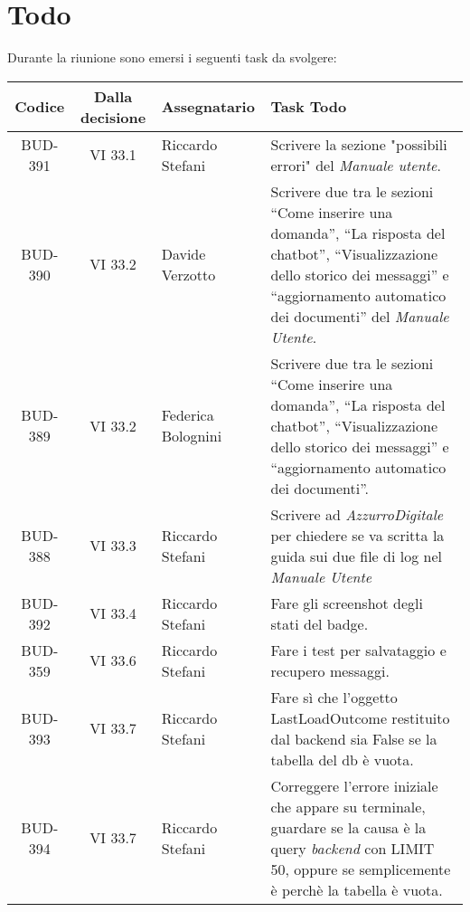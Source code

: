 
\section{Todo}

Durante la riunione sono emersi i seguenti task da svolgere:

\vspace{0.5cm}

\begin{table}[htbp]
\centering
{}
\begin{tabular}{|c|c|p{}|p{}|}
    \hline
    \rowcolor[gray]{0.75}
    \textbf{Codice} & \textbf{Dalla decisione} & \textbf{Assegnatario} & \textbf{Task Todo} \\
    \hline
    BUD-391 & VI 33.1 & Riccardo Stefani & Scrivere la sezione "possibili errori" del \emph{Manuale utente}.\\
    \hline
    BUD-390 & VI 33.2 & Davide Verzotto & Scrivere due tra le sezioni “Come inserire una domanda”, “La risposta del chatbot”, “Visualizzazione dello storico dei messaggi” e “aggiornamento automatico dei documenti” del \emph{Manuale Utente}.\\
    \hline
    BUD-389 & VI 33.2 & Federica Bolognini & Scrivere due tra le sezioni “Come inserire una domanda”, “La risposta del chatbot”, “Visualizzazione dello storico dei messaggi” e “aggiornamento automatico dei documenti”. \\
    \hline 
    BUD-388 & VI 33.3 & Riccardo Stefani & Scrivere ad \emph{AzzurroDigitale} per chiedere se va scritta la guida sui due file di log nel \emph{Manuale Utente} \\
    \hline
    BUD-392 & VI 33.4 & Riccardo Stefani & Fare gli screenshot degli stati del badge. \\
    \hline
    BUD-359 & VI 33.6 & Riccardo Stefani & Fare i test per salvataggio e recupero messaggi. \\
    \hline
    BUD-393 & VI 33.7 & Riccardo Stefani & Fare sì che l’oggetto LastLoadOutcome restituito dal backend sia False se la tabella del db è vuota. \\
    \hline
    BUD-394 & VI 33.7 & Riccardo Stefani & Correggere l’errore iniziale che appare su terminale, guardare se la causa è la query \emph{backend} con LIMIT 50, oppure se semplicemente è perchè la tabella è vuota. \\

\end{tabular}
\end{table}
